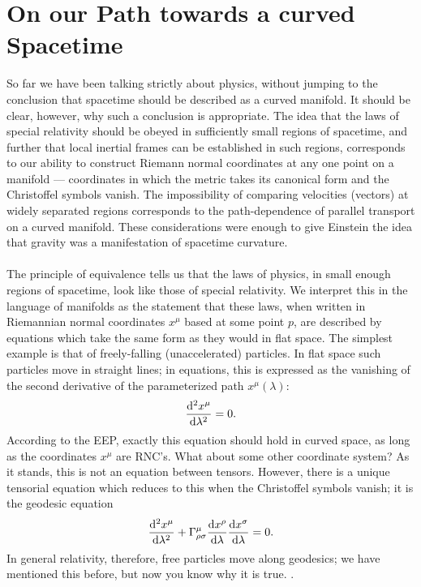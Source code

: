 \section{On our Path towards a curved Spacetime}
So far we have been talking strictly about physics, without jumping to the conclusion
that spacetime should be described as a curved manifold. It should be clear, however, why
such a conclusion is appropriate. The idea that the laws of special relativity should be
obeyed in sufficiently small regions of spacetime, and further that local inertial frames can
be established in such regions, corresponds to our ability to construct Riemann normal coordinates at any one point on a manifold — coordinates in which the metric takes its canonical
form and the Christoffel symbols vanish. The impossibility of comparing velocities (vectors)
at widely separated regions corresponds to the path-dependence of parallel transport on a
curved manifold. These considerations were enough to give Einstein the idea that gravity
was a manifestation of spacetime curvature.\\
\\
The principle of
equivalence tells us that the laws of physics, in small enough regions of spacetime, look like
those of special relativity. We interpret this in the language of manifolds as the statement
that these laws, when written in Riemannian normal coordinates $x^μ$ based at some point
$p$, are described by equations which take the same form as they would in flat space. The
simplest example is that of freely-falling (unaccelerated) particles. In flat space such particles
move in straight lines; in equations, this is expressed as the vanishing of the second derivative
of the parameterized path $x^μ (λ)$:
\begin{equation}
\frac{\mathrm{d}^2 x^\mu}{\mathrm{d} \lambda^2} = 0.
\end{equation}
According to the EEP, exactly this equation should hold in curved space, as long as the
coordinates $x^μ$ are RNC’s. What about some other coordinate system? As it stands, this is not an equation between tensors. However, there is a unique tensorial equation which
reduces to this when the Christoffel symbols vanish; it is the geodesic equation
\begin{equation}
\frac{\mathrm{d}^2 x^\mu}{\mathrm{d} \lambda^2} + \Gamma^\mu_{\rho \sigma} \frac{\mathrm{d} x^\rho}{\mathrm{d} \lambda} \frac{\mathrm{d} x^\sigma}{\mathrm{d} \lambda} = 0.
\end{equation}
In general relativity, therefore, free particles
move along geodesics; we have mentioned this before, but now you know why it is true.
.

